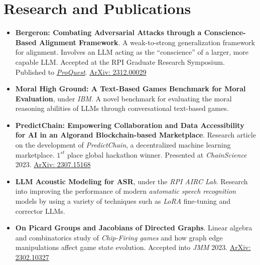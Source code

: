 \documentclass[11pt]{article}
\begin{document}
\section*{Research and Publications}
\begin{itemize}
    \itemsep0em
    
    \item \textbf{Bergeron: Combating Adversarial Attacks through a Conscience-Based Alignment Framework}.  A weak-to-strong generalization framework for alignment.  Involves an LLM acting as the ``conscience'' of a larger, more capable LLM.  Accepted at the RPI Graduate Research Symposium.  Published to \href{https://www.proquest.com/openview/fc38d3daf9e6be8598ba7ec38aa7d3af/1?pq-origsite=gscholar&cbl=18750&diss=y}{\textit{ProQuest}}.  \href{https://arxiv.org/abs/2312.00029}{ArXiv: 2312.00029}
    
    \item \textbf{Moral High Ground: A Text-Based Games Benchmark for Moral Evaluation}, under \textit{IBM}.  A novel benchmark for evaluating the moral reasoning abilities of LLMs through conversational text-based games.
    
    \item \textbf{PredictChain: Empowering Collaboration and Data Accessibility for AI in an Algorand Blockchain-based Marketplace}.  Research article on the development of \textit{PredictChain}, a decentralized machine learning marketplace.  $1^{st}$ place global hackathon winner.  Presented at \textit{ChainScience} 2023. \href{https://arxiv.org/abs/2307.15168}{ArXiv: 2307.15168}
    
    \item \textbf{LLM Acoustic Modeling for ASR}, under the \textit{RPI AIRC Lab}. Research into improving the performance of modern \textit{automatic speech recognition} models by using a variety of techniques such as \textit{LoRA} fine-tuning and corrector LLMs.
    
    \item \textbf{On Picard Groups and Jacobians of Directed Graphs}. Linear algebra and combinatorics study of \textit{Chip-Firing games} and how graph edge manipulations affect game state evolution.  Accepted into \textit{JMM} 2023.  \href{https://arxiv.org/abs/2302.10327}{ArXiv: 2302.10327}
    
\end{itemize}
\end{document}
